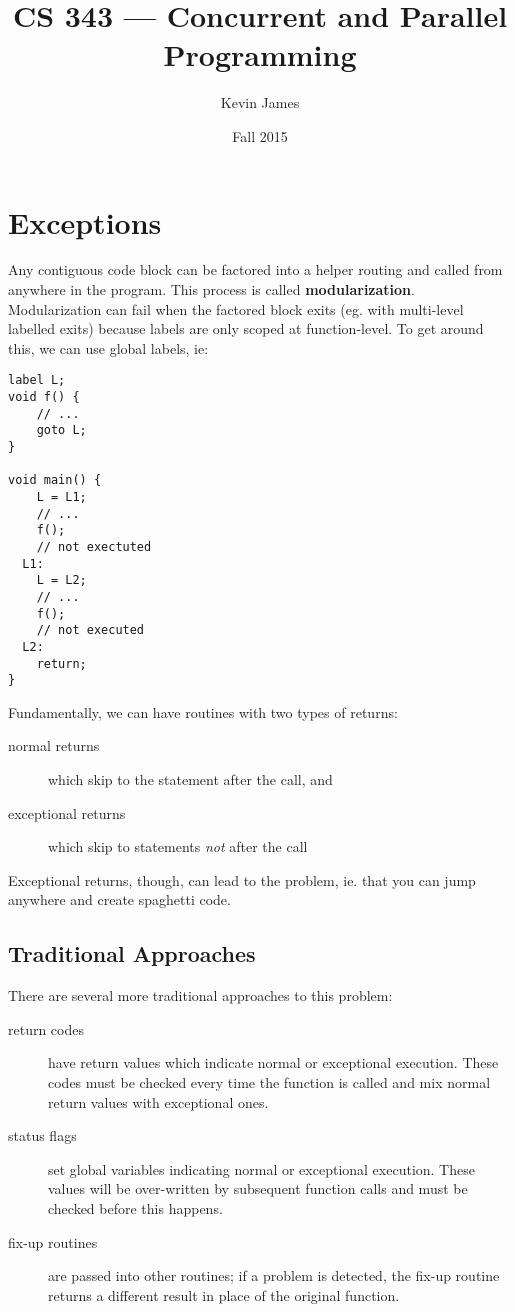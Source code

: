 \documentclass[12pt]{article}
\begin{document}
\title{CS 343 --- Concurrent and Parallel Programming}
\author{Kevin James}
\date{\vspace{-2ex}Fall 2015}
\maketitle\HRule

\tableofcontents
\newpage

\section{Exceptions}
Any contiguous code block can be factored into a helper routing and called from anywhere in the program. This process is called {\bf modularization}. Modularization can fail when the factored block exits (eg. with multi-level labelled exits) because labels are only scoped at function-level. To get around this, we can use global labels, ie:

\begin{verbatim}
label L;
void f() {
    // ...
    goto L;
}

void main() {
    L = L1;
    // ...
    f();
    // not exectuted
  L1:
    L = L2;
    // ...
    f();
    // not executed
  L2:
    return;
}
\end{verbatim}

Fundamentally, we can have routines with two types of returns:
\begin{description}
\item[normal returns] which skip to the statement after the call, and
\item[exceptional returns] which skip to statements \textit{not} after the call
\end{description}

Exceptional returns, though, can lead to the  problem, ie. that you can jump anywhere and create spaghetti code.

\subsection{Traditional Approaches}
There are several more traditional approaches to this problem:
\begin{description}
\item[return codes] have return values which indicate normal or exceptional execution. These codes must be checked every time the function is called and mix normal return values with exceptional ones.
\item[status flags] set global variables indicating normal or exceptional execution. These values will be over-written by subsequent function calls and must be checked before this happens.
\item[fix-up routines] are passed into other routines; if a problem is detected, the fix-up routine returns a different result in place of the original function.
\end{description}
\end{document}
